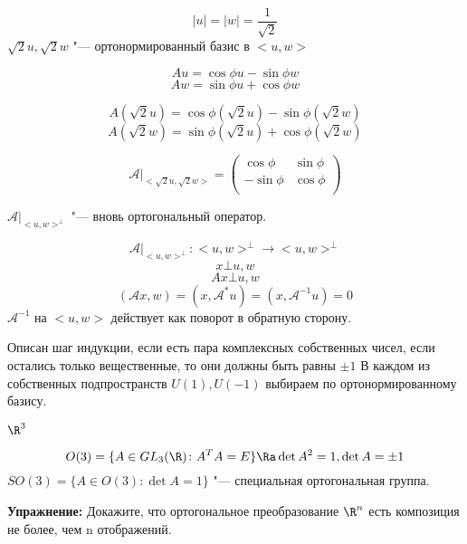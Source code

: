 $$|u| = |w| = \frac{1}{\sqrt{2}}$$
$\sqrt{2}u, \sqrt{2} w$ "--- ортонормированный базис в $<u, w>$

$$Au = \cos \phi u - \sin \phi w$$
$$Aw = \sin \phi u + \cos \phi w$$


$$A(\sqrt 2 u) = \cos \phi (\sqrt 2 u) - \sin \phi (\sqrt 2 w)$$
$$A(\sqrt 2 w) = \sin \phi (\sqrt 2 u) + \cos \phi (\sqrt 2 w)$$

$$\mathscr{A}|_{<\sqrt2 u, \sqrt2w>} = \begin{pmatrix}
 \cos \phi & \sin \phi\\
 - \sin \phi & \cos \phi\\
 \end{pmatrix}$$

$\mathscr{A}|_{<u, w>^{\bot}}$ "--- вновь ортогональный оператор. 

$$\mathscr{A}|_{<u, w>^{\bot}} \colon <u, w>^{\bot}\to <u,w>^{\bot}$$
$$x \bot u, w $$
$$Ax \bot u, w$$
$$(\mathscr{A}x, w) = (x, \mathscr{A}^*u) = (x, \mathscr{A}^{-1}u) = 0$$
$\mathscr{A}^{-1}$ на $<u, w>$ действует как поворот в обратную сторону. 

Описан шаг индукции, если есть пара комплексных собственных чисел, 
если остались только вещественные, то они должны быть равны $\pm 1$ 
В каждом из собственных подпространств $U(1), U(-1)$ выбираем по ортонормированному базису. 

\begin{exmp}
$\R^3$

$$O(3) = \{ A \in GL_3(\R) \colon A^{T}A = E\} \Ra \det A^2 = 1, \det A = \pm 1$$
$SO(3) = \{A \in O(3)\colon \det A = 1\} $ "--- специальная ортогональная группа. 
\end{exmp}

\textbf{Упражнение:} Докажите, что ортогональное преобразование $\R^n$ есть 
композиция не более, чем n отображений. 

